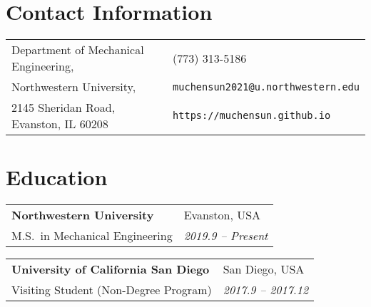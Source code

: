 \documentclass[margin,line,pifont,palatino,courier]{res}
\begin{document}
	
	
	\begin{resume}
		
		\section{\sc Contact Information}
		
		\begin{tabular}{@{}p{2.7in}p{2in}}
			Department of Mechanical Engineering, & (773) 313-5186 \\
			Northwestern University,  & \verb+muchensun2021@u.northwestern.edu+\\
			2145 Sheridan Road, Evanston, IL 60208 & \verb+https://muchensun.github.io+\\
		\end{tabular}
				
		\section{\sc Education}
		
		\begin{tabular}{@{}p{3.9in}p{2.0in}}
			{\bf Northwestern University} & {\sc Evanston, USA} \\
			M.S.~in Mechanical Engineering & {\sl 2019.9 -- Present} \\
		\end{tabular}
		
		\begin{tabular}{@{}p{3.9in}p{2.0in}}
			{\bf University of California San Diego} & {\sc San Diego, USA} \\
			Visiting Student (Non-Degree Program) & {\sl 2017.9 -- 2017.12} \\
		\end{tabular}
		

\end{resume}
\end{document}
